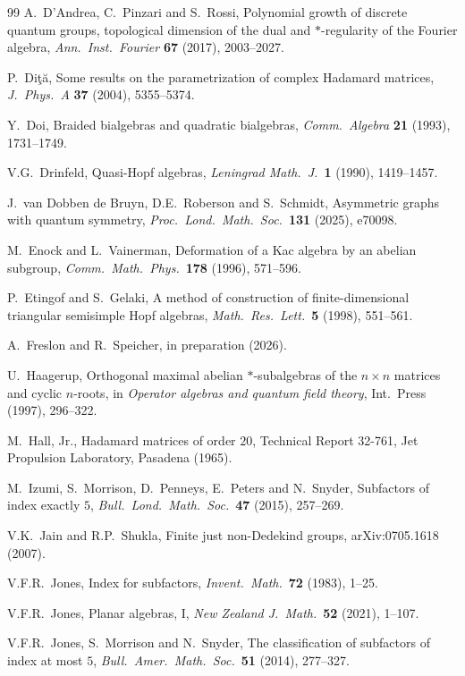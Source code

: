 \documentclass[11pt]{amsart}
\theoremstyle{definition}
\theoremstyle{remark}
\theoremstyle{plain}
\numberwithin{equation}{section}
\numberwithin{table}{section}
\begin{document}
\begin{thebibliography}{99}
 A.~D'Andrea, C.~Pinzari and S.~Rossi, Polynomial growth of discrete quantum groups, topological dimension of the dual and $*$-regularity of the Fourier algebra, \emph{Ann.\ Inst.\ Fourier} \textbf{67} (2017), 2003--2027.

 P.~Di\c{t}\u{a}, Some results on the parametrization of complex Hadamard matrices, \emph{J.\ Phys.\ A} \textbf{37} (2004), 5355--5374.

 Y.~Doi, Braided bialgebras and quadratic bialgebras, \emph{Comm.\ Algebra} \textbf{21} (1993), 1731--1749.

 V.G.~Drinfeld, Quasi-Hopf algebras, \emph{Leningrad Math.\ J.}\ \textbf{1} (1990), 1419--1457.

 J.~van Dobben de Bruyn, D.E.~Roberson and S.~Schmidt, Asymmetric graphs with quantum symmetry, \emph{Proc.\ Lond.\ Math.\ Soc.}\ \textbf{131} (2025), e70098.

 M.~Enock and L.~Vainerman, Deformation of a Kac algebra by an abelian subgroup, \emph{Comm.\ Math.\ Phys.}\ \textbf{178} (1996), 571--596.

 P.~Etingof and S.~Gelaki, A method of construction of finite-dimensional triangular semisimple Hopf algebras, \emph{Math.\ Res.\ Lett.}\ \textbf{5} (1998), 551--561.

 A.~Freslon and R.~Speicher, in preparation (2026).

 U.~Haagerup, Orthogonal maximal abelian $*$-subalgebras of the $n\times n$ matrices and cyclic $n$-roots, in \emph{Operator algebras and quantum field theory}, Int.\ Press (1997), 296--322.

 M.~Hall, Jr., Hadamard matrices of order $20$, Technical Report 32-761, Jet Propulsion Laboratory, Pasadena (1965).

 M.~Izumi, S.~Morrison, D.~Penneys, E.~Peters and N.~Snyder, Subfactors of index exactly $5$, \emph{Bull.\ Lond.\ Math.\ Soc.}\ \textbf{47} (2015), 257--269.

 V.K.~Jain and R.P.~Shukla, Finite just non-Dedekind groups, arXiv:0705.1618 (2007).

 V.F.R.~Jones, Index for subfactors, \emph{Invent.\ Math.}\ \textbf{72} (1983), 1--25.

 V.F.R.~Jones, Planar algebras, I, \emph{New Zealand J.\ Math.}\ \textbf{52} (2021), 1--107.

 V.F.R.~Jones, S.~Morrison and N.~Snyder, The classification of subfactors of index at most $5$, \emph{Bull.\ Amer.\ Math.\ Soc.}\ \textbf{51} (2014), 277--327.


\end{thebibliography}
\end{document}
